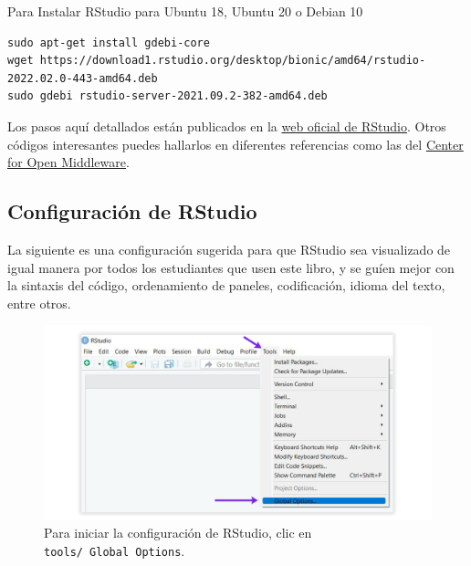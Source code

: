 \documentclass[
]{article}
\theoremstyle{definition}
\theoremstyle{definition}
\theoremstyle{definition}
\theoremstyle{definition}
\theoremstyle{remark}
\begin{document}
Para Instalar RStudio para Ubuntu 18, Ubuntu 20 o Debian 10

\begin{verbatim}
sudo apt-get install gdebi-core
wget https://download1.rstudio.org/desktop/bionic/amd64/rstudio-2022.02.0-443-amd64.deb
sudo gdebi rstudio-server-2021.09.2-382-amd64.deb
\end{verbatim}

Los pasos aquí detallados están publicados en la \href{https://www.rstudio.com/products/rstudio/download-server/debian-ubuntu/}{web oficial de RStudio}. Otros códigos interesantes puedes hallarlos en diferentes referencias como las del \href{http://www.upm.es/sfs/Rectorado/Gabinete\%20del\%20Rector/Notas\%20de\%20Prensa/2015/05/documentos/Instrucciones\%20de\%20instalaci\%C3\%B3n\%20de\%20R\%20y\%20RStudio.pdf}{Center for Open Middleware}.

\hypertarget{configuraciuxf3n-de-rstudio}{%
\subsection{Configuración de RStudio}\label{configuraciuxf3n-de-rstudio}}

La siguiente es una configuración sugerida para que RStudio sea visualizado de igual manera por todos los estudiantes que usen este libro, y se guíen mejor con la sintaxis del código, ordenamiento de paneles, codificación, idioma del texto, entre otros.



\begin{figure}

{\centering \includegraphics[width=1\linewidth]{figs/screenshots/configRStudio-1} 

}

\caption{Para iniciar la configuración de RStudio, clic en \texttt{tools/\ Global\ Options}.}\label{fig:figura2}
\end{figure}
\end{document}

